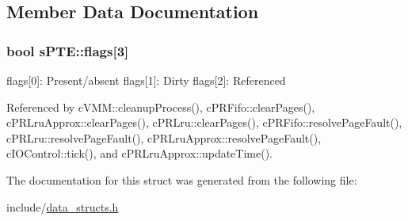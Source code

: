 \subsection{\-Member \-Data \-Documentation}
\hypertarget{structsPTE_a5088ab9c05c286c643ef97d04a3c9dad}{
\subsubsection[{flags}]{\setlength{\rightskip}{0pt plus 5cm}bool {\bf s\-P\-T\-E\-::flags}\mbox{[}3\mbox{]}}}\label{db/d4b/structsPTE_a5088ab9c05c286c643ef97d04a3c9dad}
flags\mbox{[}0\mbox{]}\-: \-Present/absent flags\mbox{[}1\mbox{]}\-: \-Dirty flags\mbox{[}2\mbox{]}\-: \-Referenced 

\-Referenced by c\-V\-M\-M\-::cleanup\-Process(), c\-P\-R\-Fifo\-::clear\-Pages(), c\-P\-R\-Lru\-Approx\-::clear\-Pages(), c\-P\-R\-Lru\-::clear\-Pages(), c\-P\-R\-Fifo\-::resolve\-Page\-Fault(), c\-P\-R\-Lru\-::resolve\-Page\-Fault(), c\-P\-R\-Lru\-Approx\-::resolve\-Page\-Fault(), c\-I\-O\-Control\-::tick(), and c\-P\-R\-Lru\-Approx\-::update\-Time().



\-The documentation for this struct was generated from the following file\-:\begin{DoxyCompactItemize}
\item 
include/\hyperlink{data__structs_8h}{data\-\_\-structs.\-h}\end{DoxyCompactItemize}
